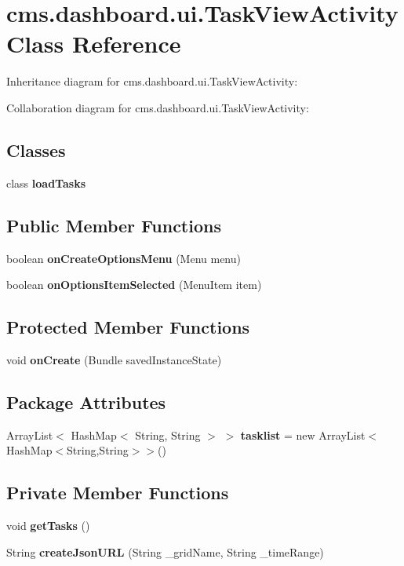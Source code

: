 \section{cms.\-dashboard.\-ui.\-Task\-View\-Activity \-Class \-Reference}
\label{classcms_1_1dashboard_1_1ui_1_1_task_view_activity}


\-Inheritance diagram for cms.\-dashboard.\-ui.\-Task\-View\-Activity\-:


\-Collaboration diagram for cms.\-dashboard.\-ui.\-Task\-View\-Activity\-:
\subsection*{\-Classes}
\begin{DoxyCompactItemize}
\item 
class {\bf load\-Tasks}
\end{DoxyCompactItemize}
\subsection*{\-Public \-Member \-Functions}
\begin{DoxyCompactItemize}
\item 
boolean {\bf on\-Create\-Options\-Menu} (\-Menu menu)
\item 
boolean {\bf on\-Options\-Item\-Selected} (\-Menu\-Item item)
\end{DoxyCompactItemize}
\subsection*{\-Protected \-Member \-Functions}
\begin{DoxyCompactItemize}
\item 
void {\bf on\-Create} (\-Bundle saved\-Instance\-State)
\end{DoxyCompactItemize}
\subsection*{\-Package \-Attributes}
\begin{DoxyCompactItemize}
\item 
\-Array\-List$<$ \-Hash\-Map$<$ \-String, \*
\-String $>$ $>$ {\bf tasklist} = new \-Array\-List$<$\-Hash\-Map$<$\-String,\-String$>$$>$()
\end{DoxyCompactItemize}
\subsection*{\-Private \-Member \-Functions}
\begin{DoxyCompactItemize}
\item 
void {\bf get\-Tasks} ()
\item 
\-String {\bf create\-Json\-U\-R\-L} (\-String \-\_\-grid\-Name, \-String \-\_\-time\-Range)
\end{DoxyCompactItemize}
